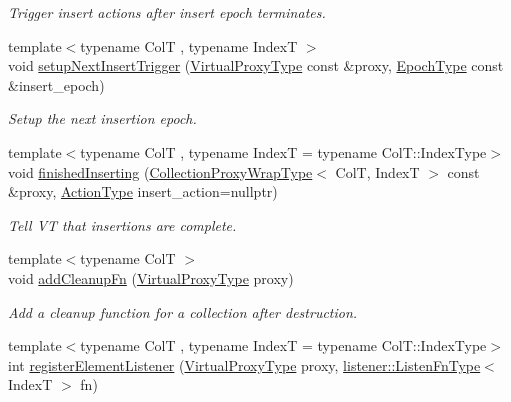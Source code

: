 \begin{DoxyCompactItemize}
\begin{DoxyCompactList}\small\item\em Trigger insert actions after insert epoch terminates. \end{DoxyCompactList}\item 
{\footnotesize template$<$typename ColT , typename IndexT $>$ }\\void \hyperlink{structvt_1_1vrt_1_1collection_1_1_collection_manager_a1d93ed0d843deb241d788c305033b9e0}{setup\+Next\+Insert\+Trigger} (\hyperlink{namespacevt_a1b417dd5d684f045bb58a0ede70045ac}{Virtual\+Proxy\+Type} const \&proxy, \hyperlink{namespacevt_a985a5adf291c34a3ca263b3378388236}{Epoch\+Type} const \&insert\+\_\+epoch)
\begin{DoxyCompactList}\small\item\em Setup the next insertion epoch. \end{DoxyCompactList}\item 
{\footnotesize template$<$typename ColT , typename IndexT  = typename Col\+T\+::\+Index\+Type$>$ }\\void \hyperlink{structvt_1_1vrt_1_1collection_1_1_collection_manager_a54edc9079585574858ecf512761f8efc}{finished\+Inserting} (\hyperlink{structvt_1_1vrt_1_1collection_1_1_collection_manager_a56458ed7f9bb22b631b9b3a745f42f94}{Collection\+Proxy\+Wrap\+Type}$<$ ColT, IndexT $>$ const \&proxy, \hyperlink{namespacevt_ae0a5a7b18cc99d7b732cb4d44f46b0f3}{Action\+Type} insert\+\_\+action=nullptr)
\begin{DoxyCompactList}\small\item\em Tell VT that insertions are complete. \end{DoxyCompactList}\item 
{\footnotesize template$<$typename ColT $>$ }\\void \hyperlink{structvt_1_1vrt_1_1collection_1_1_collection_manager_a3ef00b90a3a2d066a7f83b9c32b301d2}{add\+Cleanup\+Fn} (\hyperlink{namespacevt_a1b417dd5d684f045bb58a0ede70045ac}{Virtual\+Proxy\+Type} proxy)
\begin{DoxyCompactList}\small\item\em Add a cleanup function for a collection after destruction. \end{DoxyCompactList}\item 
{\footnotesize template$<$typename ColT , typename IndexT  = typename Col\+T\+::\+Index\+Type$>$ }\\int \hyperlink{structvt_1_1vrt_1_1collection_1_1_collection_manager_a790738e12739058e7a09b4a3246169e8}{register\+Element\+Listener} (\hyperlink{namespacevt_a1b417dd5d684f045bb58a0ede70045ac}{Virtual\+Proxy\+Type} proxy, \hyperlink{namespacevt_1_1vrt_1_1collection_1_1listener_a62d04c44a3c187eae66bdba2090b4505}{listener\+::\+Listen\+Fn\+Type}$<$ IndexT $>$ fn)

\end{DoxyCompactItemize}
